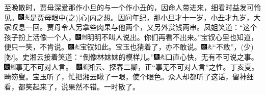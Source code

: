 至晚散时，贾母深爱那作小旦的与一个作小丑的，因命人带进来，细看时益发可怜见。{\includegraphics[width=3mm]{../Images/00004}\includegraphics[width=3mm]{../Images/00012}\footnotesize \kaishu 是贾母眼中{(之)}{[}心{]}内之想。}因问年纪，那小旦才十一岁，小丑才九岁，大家叹息一回。贾母令人另拿些肉果与他两个，又另外赏钱两串。凤姐笑道：“这个孩子扮上活像一个人，{\includegraphics[width=3mm]{../Images/00004}\includegraphics[width=3mm]{../Images/00011}\footnotesize \kaishu 明明不叫人说出。}你们再看不出来。”宝钗心里也知道，便只一笑，不肯说。{\includegraphics[width=3mm]{../Images/00004}\includegraphics[width=3mm]{../Images/00012}\footnotesize \kaishu 宝钗如此。}宝玉也猜着了，亦不敢说。{\includegraphics[width=3mm]{../Images/00004}\includegraphics[width=3mm]{../Images/00012}\footnotesize \kaishu “不敢”，{(少)}{[}妙{]}。}史湘云接着笑道：“倒像林妹妹的模样儿。”{\includegraphics[width=3mm]{../Images/00004}\includegraphics[width=3mm]{../Images/00012}\footnotesize \kaishu 口直心快，无有不可说之事。　{\includegraphics[width=3mm]{../Images/00004}\includegraphics[width=3mm]{../Images/00011}\footnotesize \kaishu 事无不可对人言。　\includegraphics[width=3mm]{../Images/00004}\includegraphics[width=3mm]{../Images/00010}\footnotesize \kaishu 湘云、探春二卿，正“事无不可对人言”之性。丁亥夏。畸笏叟。}}宝玉听了，忙把湘云瞅了一眼，使个眼色。众人却都听了这话，留神细看，都笑起来了，说果然不错。一时散了。

